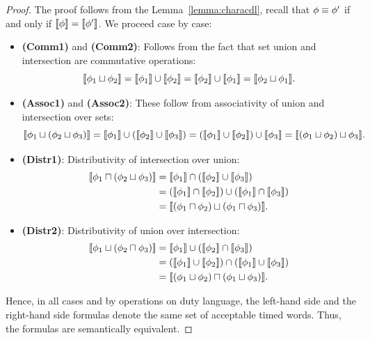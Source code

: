 \begin{proof}
The proof follows from the Lemma~\ref{lemma:characdl}, recall that $\phi \equiv  \phi'$ if and only if $\llbracket \phi \rrbracket = \llbracket \phi' \rrbracket$. We proceed case by case:

\begin{itemize}
    \item \textbf{(Comm1)} and \textbf{(Comm2)}: Follows from the fact that set union and intersection are commutative operations:
    \[
    \llbracket \phi_1 \sqcup \phi_2 \rrbracket = \llbracket \phi_1 \rrbracket \cup \llbracket \phi_2 \rrbracket = \llbracket \phi_2 \rrbracket \cup \llbracket \phi_1 \rrbracket = \llbracket \phi_2 \sqcup \phi_1 \rrbracket.
    \]

      \item \textbf{(Assoc1)} and \textbf{(Assoc2)}: These follow from associativity of union and intersection over sets:
    \[
    \llbracket \phi_1 \sqcup (\phi_2 \sqcup \phi_3) \rrbracket = \llbracket \phi_1 \rrbracket \cup (\llbracket \phi_2 \rrbracket \cup \llbracket \phi_3 \rrbracket) = (\llbracket \phi_1 \rrbracket \cup \llbracket \phi_2 \rrbracket) \cup \llbracket \phi_3 \rrbracket = \llbracket (\phi_1 \sqcup \phi_2) \sqcup \phi_3 \rrbracket.
    \]

    \item \textbf{(Distr1)}: Distributivity of intersection over union:
    \[
\begin{aligned}
\llbracket \phi_1 \sqcap (\phi_2 \sqcup \phi_3) \rrbracket
&= \llbracket \phi_1 \rrbracket \cap (\llbracket \phi_2 \rrbracket \cup \llbracket \phi_3 \rrbracket) \\
&= (\llbracket \phi_1 \rrbracket \cap \llbracket \phi_2 \rrbracket) \cup (\llbracket \phi_1 \rrbracket \cap \llbracket \phi_3 \rrbracket) \\
&= \llbracket (\phi_1 \sqcap \phi_2) \sqcup (\phi_1 \sqcap \phi_3) \rrbracket .
\end{aligned}
\]

    \item \textbf{(Distr2)}: Distributivity of union over intersection:
    \[
\begin{aligned}
\llbracket \phi_1 \sqcup (\phi_2 \sqcap \phi_3) \rrbracket
&= \llbracket \phi_1 \rrbracket \cup (\llbracket \phi_2 \rrbracket \cap \llbracket \phi_3 \rrbracket) \\
&= (\llbracket \phi_1 \rrbracket \cup \llbracket \phi_2 \rrbracket) \cap (\llbracket \phi_1 \rrbracket \cup \llbracket \phi_3 \rrbracket) \\
&= \llbracket (\phi_1 \sqcup \phi_2) \sqcap (\phi_1 \sqcup \phi_3) \rrbracket .
\end{aligned}
\]
\end{itemize}
Hence, in all cases and by operations on duty language, the left-hand side and the right-hand side formulas denote the same set of acceptable timed words. Thus, the formulas are semantically equivalent.
\end{proof}

